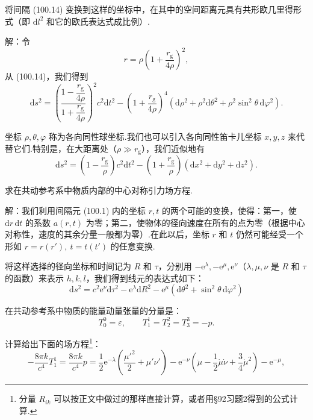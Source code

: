 \begin{xiti}
\quad 将间隔 (100.14) 变换到这样的坐标中，在其中的空间距离元具有共形欧几里得形式（即 $\mathrm{d}l^{2}$ 和它的欧氏表达式成比例）.

解：令
\begin{equation*}
  r=\rho\left(1+\frac{r_{\mathrm{g}}}{4\rho}\right)^{2},
\end{equation*}
从 (100.14)，我们得到
\begin{equation*}
  \mathrm{d}s^{2}=\left(\frac{1-\dfrac{r_{\mathrm{g}}}{4\rho}}
  {1+\dfrac{r_{\mathrm{g}}}{4\rho}}\right)^{2}c^{2}\mathrm{d}t^{2}
  -\left(1+\frac{r_{\mathrm{g}}}{4\rho}\right)^{4}
  (\mathrm{d}\rho^{2}+\rho^{2}\mathrm{d}\theta^{2}
  +\rho^{2}\sin^{2}\theta\,\mathrm{d}\varphi^{2}).
\end{equation*}

坐标 $\rho,\theta,\varphi$ 称为各向同性球坐标.我们也可以引入各向同性笛卡儿坐标 $x,y,z$ 来代替它们.特别是，在大距离处（$\rho\gg r_{\mathrm{g}}$），我们近似地有
\begin{equation*}
  \mathrm{d}s^{2}=\left(1-\frac{r_{\mathrm{g}}}{\rho}\right)c^{2}\mathrm{d}t^{2}
  -\left(1+\frac{r_{\mathrm{g}}}{\rho}\right)
  (\mathrm{d}x^{2}+\mathrm{d}y^{2}+\mathrm{d}z^{2}).
\end{equation*}

\quad 求在共动参考系中物质内部的中心对称引力场方程.

解：我们利用间隔元 (100.1) 内的坐标 $r,t$ 的两个可能的变换，使得：第一，使 $\mathrm{d}r\,\mathrm{d}t$ 的系数 $a(r,t)$ 为零；第二，使物体的径向速度在所有的点为零（根据中心对称性，速度的其余分量一般都为零）.在此以后，坐标 $r$ 和 $t$ 仍然可能经受一个形如 $r=r(r'),\ t=t(t')$ 的任意变换.

将这样选择的径向坐标和时间记为 $R$ 和 $\tau$，分别用 $-\mathrm{e}^{\lambda},-\mathrm{e}^{\mu},\mathrm{e}^{\nu}$（$\lambda,\mu,\nu$ 是 $R$ 和 $\tau$ 的函数）来表示 $h,k,l$，我们得到线元的表达式如下：
\begin{equation}
  \mathrm{d}s^{2}=c^{2}\mathrm{e}^{\nu}\mathrm{d}\tau^{2}
  -\mathrm{e}^{\lambda}\mathrm{d}R^{2}
  -\mathrm{e}^{\mu}(\mathrm{d}\theta^{2}+\sin^{2}\theta\,\mathrm{d}\varphi^{2})
  \tag{1}
\end{equation}

在共动参考系中物质的能量动量张量的分量是：
\begin{equation*}
  T_0^0=\varepsilon,\qquad T_1^1=T_2^2=T_3^3=-p.
\end{equation*}

计算给出下面的场方程\footnote{分量 $R_{ik}$ 可以按正文中做过的那样直接计算，或者用§92习题2得到的公式计算.}：
  \begin{equation}
  -\frac{8\pi k}{c^{4}}T_1^1=\frac{8\pi k}{c^{4}}p
  =\frac{1}{2}\mathrm{e}^{-\lambda}
  \left(\frac{\mu'^{2}}{2}+\mu'\nu'\right)
  -\mathrm{e}^{-\nu}\left(\ddot{\mu}-\frac{1}{2}\dot{\mu}\dot{\nu}
  +\frac{3}{4}\dot{\mu}^{2}\right)-\mathrm{e}^{-\mu},
  \tag{2}
\end{equation}


\end{xiti}
